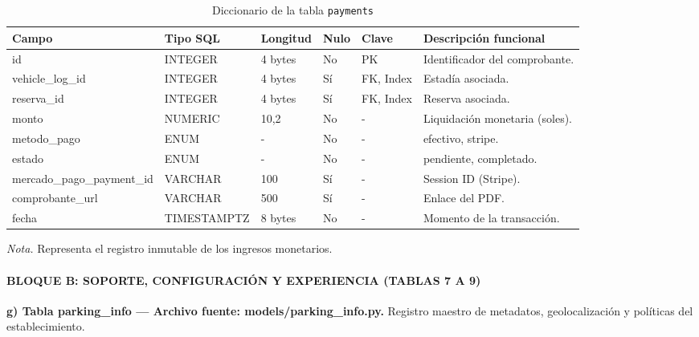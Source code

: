 \begin{table}[htbp]
\caption{Diccionario de la tabla \texttt{payments}}
\label{tab:dict_payments}
\begin{tabular}{@{}p{6cm} p{3cm} p{1.5cm} p{1cm} p{1.5cm} p{3cm}@{}}
\toprule
\textbf{Campo} & \textbf{Tipo SQL} & \textbf{Longitud} & \textbf{Nulo} & \textbf{Clave} & \textbf{Descripción funcional} \\
\midrule
id & INTEGER & 4 bytes & No & PK & Identificador del comprobante. \\
vehicle\_log\_id & INTEGER & 4 bytes & Sí & FK, Index & Estadía asociada. \\
reserva\_id & INTEGER & 4 bytes & Sí & FK, Index & Reserva asociada. \\
monto & NUMERIC & 10,2 & No & - & Liquidación monetaria (soles). \\
metodo\_pago & ENUM & - & No & - & efectivo, stripe. \\
estado & ENUM & - & No & - & pendiente, completado. \\
mercado\_pago\_payment\_id & VARCHAR & 100 & Sí & - & Session ID (Stripe). \\
comprobante\_url & VARCHAR & 500 & Sí & - & Enlace del PDF. \\
fecha & TIMESTAMPTZ & 8 bytes & No & - & Momento de la transacción. \\
\bottomrule
\end{tabular}
\par\vspace{0.2cm}
\textit{Nota.} Representa el registro inmutable de los ingresos monetarios.
\end{table}

\paragraph{BLOQUE B: SOPORTE, CONFIGURACIÓN Y EXPERIENCIA (TABLAS 7 A 9)}

\textbf{g) Tabla parking\_info — Archivo fuente: models/parking\_info.py.} Registro maestro de metadatos, geolocalización y políticas del establecimiento.

